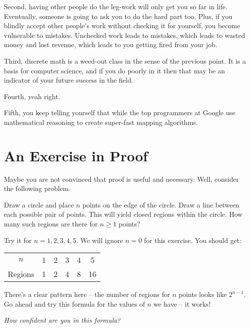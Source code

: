 \documentclass[main.tex]{subfiles}
\begin{document}
Second, having other people do the leg-work will only get you so far in life. Eventually, someone is going to ask you to do the hard part too. Plus, if you blindly accept other people's work without checking it for yourself, you become vulnerable to mistakes. Unchecked work leads to mistakes, which leads to wasted money and lost revenue, which leads to you getting fired from your job.

Third, discrete math is a weed-out class in the sense of the previous point. It is a basis for computer science, and if you do poorly in it then that may be an indicator of your future success in the field.

Fourth, yeah right.

Fifth, you keep telling yourself that while the top programmers at Google use mathematical reasoning to create super-fast mapping algorithms.

\section{An Exercise in Proof}

Maybe you are not convinced that proof is useful and necessary. Well, consider the following problem.

\begin{boxx}
	Draw a circle and place \(n\) points on the edge of the circle. Draw a line between each possible pair of points. This will yield closed regions within the circle. How many such regions are there for \(n \geq 1\) points?
\end{boxx}

Try it for \(n = 1,2,3,4,5\). We will ignore \(n=0\) for this exercise. You should get:

\begin{center}
	\begin{tabular}{c|ccccc}
		\(n\) & 1 & 2 & 3 & 4 & 5 \\
		Regions & 1 & 2 & 4 & 8 & 16 \\
	\end{tabular}
\end{center}

There's a clear pattern here -- the number of regions for \(n\) points looks like \(2^{n-1}\). Go ahead and try this formula for the values of \(n\) we have -- it works!

\begin{center}
	\textit{How confident are you in this formula?}
\end{center}
\end{document}
